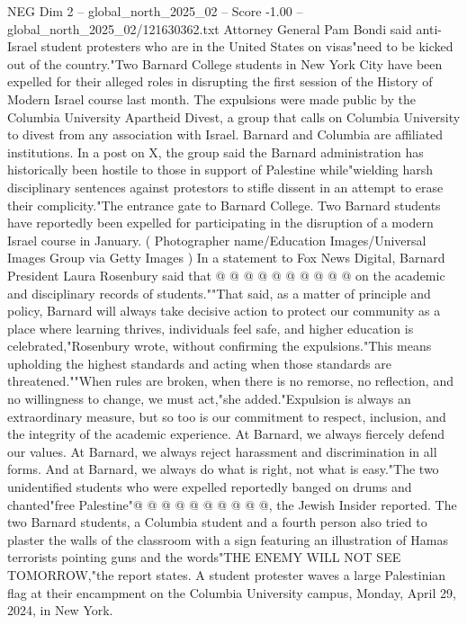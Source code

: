 \begin{textsample}{NEG Dim 2 – global\_north\_2025\_02 – Score -1.00 – global\_north\_2025\_02/121630362.txt}  \label{ex:f2_neg_010}
Attorney General Pam Bondi said anti-Israel student protesters who are in the United States on visas"need to be kicked out of the country."Two Barnard College students in New York City have been expelled for their alleged roles in disrupting the first session of the History of Modern Israel course last month.
The expulsions were made public by the Columbia University Apartheid Divest, a group that calls on Columbia University to divest from any association with Israel.
Barnard and Columbia are affiliated institutions.
In a post on X, the group said the Barnard administration has historically been hostile to those in support of Palestine while"wielding harsh disciplinary sentences against protestors to stifle dissent in an attempt to erase their complicity."The entrance gate to Barnard College.
Two Barnard students have reportedly been expelled for participating in the disruption of a modern Israel course in January. ( Photographer name/Education Images/Universal Images Group via Getty Images ) In a statement to Fox News Digital, Barnard President Laura Rosenbury said that @ @ @ @ @ @ @ @ @ @ on the academic and disciplinary records of students.""That said, as a matter of principle and policy, Barnard will always take decisive action to protect our community as a place where learning thrives, individuals feel safe, and higher education is celebrated,"Rosenbury wrote, without confirming the expulsions."This means upholding the highest standards and acting when those standards are threatened.""When rules are broken, when there is no remorse, no reflection, and no willingness to change, we must act,"she added."Expulsion is always an extraordinary measure, but so too is our commitment to respect, inclusion, and the integrity of the academic experience.
At Barnard, we always fiercely defend our values.
At Barnard, we always reject harassment and discrimination in all forms.
And at Barnard, we always do what is right, not what is easy."The two unidentified students who were expelled reportedly banged on drums and chanted"free Palestine"@ @ @ @ @ @ @ @ @ @, the Jewish Insider reported.
The two Barnard students, a Columbia student and a fourth person also tried to plaster the walls of the classroom with a sign featuring an illustration of Hamas terrorists pointing guns and the words"THE ENEMY WILL NOT SEE TOMORROW,"the report states.
A student protester waves a large Palestinian flag at their encampment on the Columbia University campus, Monday, April 29, 2024, in New York.

\end{textsample}
